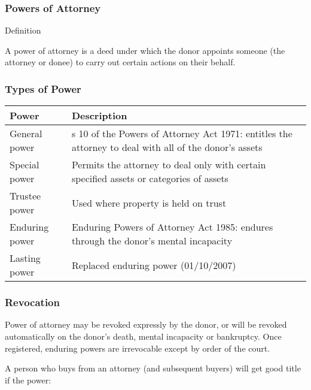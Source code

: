 \documentclass[
]{article}
\newenvironment{env-68b88379-d4cc-4b35-9b80-2115e064fa9f}
{
    \savenotes\tcolorbox[blanker,breakable,left=5pt,borderline west={2pt}{-4pt}{gold}]
}
{
    \endtcolorbox\spewnotes
}
\begin{document}
\hypertarget{powers-of-attorney}{%
\subsubsection{Powers of Attorney}\label{powers-of-attorney}}

\begin{env-68b88379-d4cc-4b35-9b80-2115e064fa9f}

Definition

A power of attorney is a deed under which the donor appoints someone
(the attorney or donee) to carry out certain actions on their behalf.

\end{env-68b88379-d4cc-4b35-9b80-2115e064fa9f}

\hypertarget{types-of-power}{%
\subsubsection{Types of Power}\label{types-of-power}}

\begin{longtable}[]{@{}ll@{}}
\toprule()
Power & Description \\
\midrule()
\endhead
General power & s 10 of the Powers of Attorney Act 1971: entitles the
attorney to deal with all of the donor's assets \\
Special power & Permits the attorney to deal only with certain specified
assets or categories of assets \\
Trustee power & Used where property is held on trust \\
Enduring power & Enduring Powers of Attorney Act 1985: endures through
the donor's mental incapacity \\
Lasting power & Replaced enduring power (01/10/2007) \\
\bottomrule()
\end{longtable}

\hypertarget{revocation}{%
\subsubsection{Revocation}\label{revocation}}

Power of attorney may be revoked expressly by the donor, or will be
revoked automatically on the donor's death, mental incapacity or
bankruptcy. Once registered, enduring powers are irrevocable except by
order of the court.

A person who buys from an attorney (and subsequent buyers) will get good
title if the power:
\end{document}
